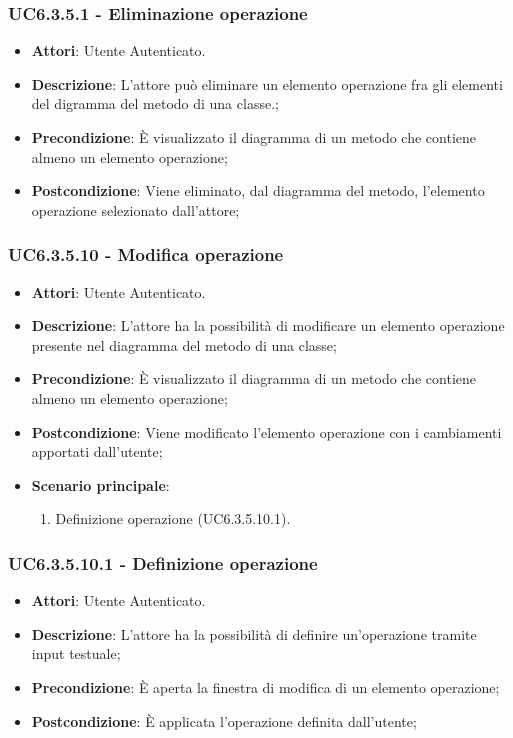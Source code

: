 \subsubsection{UC6.3.5.1 - Eliminazione operazione} 
\label{sssec:UC6.3.5.1} 
\begin{itemize} 
\item \textbf{Attori}: Utente Autenticato.
\item \textbf{Descrizione}: L'attore può eliminare un elemento operazione fra gli elementi del digramma del metodo di una classe.;
\item \textbf{Precondizione}: È visualizzato il diagramma di un metodo che contiene almeno un elemento operazione;
\item \textbf{Postcondizione}: Viene eliminato, dal diagramma del metodo,  l'elemento operazione selezionato dall'attore;
\end{itemize} 
\subsubsection{UC6.3.5.10 - Modifica operazione} 
\label{sssec:UC6.3.5.10} 
\begin{itemize} 
\item \textbf{Attori}: Utente Autenticato.
\item \textbf{Descrizione}: L'attore ha la possibilità di modificare un elemento operazione presente nel diagramma del metodo di una classe;
\item \textbf{Precondizione}: È visualizzato il diagramma di un metodo che contiene almeno un elemento operazione;
\item \textbf{Postcondizione}: Viene modificato l'elemento operazione con i cambiamenti apportati dall'utente;
\item \textbf{Scenario principale}: \begin{enumerate}\item Definizione operazione (UC6.3.5.10.1). 
 \end{enumerate}
\end{itemize} 
\subsubsection{UC6.3.5.10.1 - Definizione operazione} 
\label{sssec:UC6.3.5.10.1} 
\begin{itemize} 
\item \textbf{Attori}: Utente Autenticato.
\item \textbf{Descrizione}: L'attore ha la possibilità di definire un'operazione tramite input testuale;
\item \textbf{Precondizione}: È aperta la finestra di modifica di un elemento operazione;
\item \textbf{Postcondizione}: È applicata l'operazione definita dall'utente;
\end{itemize} 
